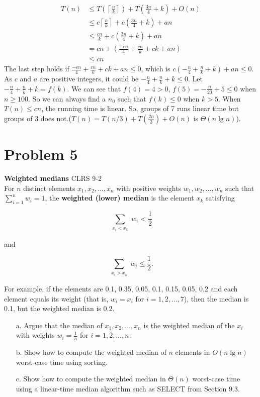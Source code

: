 \documentclass{article}
\begin{document}
\begin{align*}
    T(n) &\leq T(\left\lceil \frac{n}{k} \right\rceil) + T(\frac{3n}{4} + k) + O(n)\\
    &\leq c\left\lceil \frac{n}{k} \right\rceil + c(\frac{3n}{4} + k) +an\\
    &\leq \frac{cn}{k} + c(\frac{3n}{4} + k) +an\\
    &= cn + (\frac{-cn}{4}+\frac{cn}{k}+ck+an)\\
    &\leq cn
\end{align*}
The last step holds if $\frac{-cn}{4}+\frac{cn}{k}+ck+an \leq 0$, which is $c(-\frac{n}{4}+\frac{n}{k}+k)+an \leq 0$. As $c$ and $a$ are positive integers, it could be $-\frac{n}{4}+\frac{n}{k}+k \leq 0$. Let $-\frac{n}{4}+\frac{n}{k}+k=f(k)$. We can see that $f(4)=4>0$, $f(5)=-\frac{n}{20}+5\leq0$ when $n \geq 100$. So we can always find a $n_0$ such that $f(k) \leq 0$ when $k>5$. When $T(n)\leq cn$, the running time is linear. So, groups of 7 runs linear time but groups of 3 does not.($T(n)=T(n/3)+T(\frac{2n}{3})+O(n)$ is $\Theta(n \lg n)$).
\section*{Problem 5}
\textbf{Weighted medians} CLRS 9-2\\
For \( n \) distinct elements \( x_1, x_2, \ldots, x_n \) with positive weights \( w_1, w_2, \ldots, w_n \) such that \( \sum_{i=1}^{n} w_i = 1 \), the \textbf{weighted (lower) median} is the element \( x_k \) satisfying

\[
\sum_{\substack{x_i < x_k}} w_i < \frac{1}{2}
\]

and

\[
\sum_{\substack{x_i > x_k}} w_i \leq \frac{1}{2}.
\]

For example, if the elements are 0.1, 0.35, 0.05, 0.1, 0.15, 0.05, 0.2 and each element equals its weight (that is, \( w_i = x_i \) for \( i = 1, 2, \ldots, 7 \)), then the median is 0.1, but the weighted median is 0.2.

\begin{enumerate}
    \item[a.] Argue that the median of \( x_1, x_2, \ldots, x_n \) is the weighted median of the \( x_i \) with weights \( w_i = \frac{1}{n} \) for \( i = 1, 2, \ldots, n \).
    \item[b.] Show how to compute the weighted median of \( n \) elements in \( O(n \lg n) \) worst-case time using sorting.
    \item[c.] Show how to compute the weighted median in \( \Theta(n) \) worst-case time using a linear-time median algorithm such as SELECT from Section 9.3.
\end{enumerate}
\end{document}
